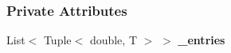 \subsubsection*{Private Attributes}
\begin{DoxyCompactItemize}
\item 
\mbox{\label{classDataTools_1_1utils_1_1PriorityQue_a8609f6bfdd54fdeff8e1f4ae6fadbe5e}} 
List$<$ Tuple$<$ double, T $>$ $>$ {\bfseries \+\_\+entries}
\end{DoxyCompactItemize}
